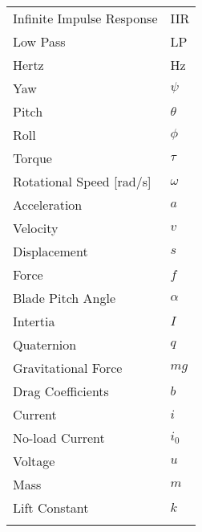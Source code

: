 \begin{center}
\begin{tabular}{l|l}
Infinite Impulse Response & IIR \\
Low Pass & LP \\\rowcolor{gainsboro}
Hertz & Hz \\
Yaw & $\psi$ \\\rowcolor{gainsboro}
Pitch & $\theta$  \\
Roll & $\phi$  \\\rowcolor{gainsboro}
Torque & $\tau$ \\
Rotational Speed [rad/s] & $\omega$ \\\rowcolor{gainsboro}
Acceleration & $a$ \\
Velocity & $v$ \\\rowcolor{gainsboro}
Displacement & $s$ \\
Force & $f$ \\\rowcolor{gainsboro}
Blade Pitch Angle & $\alpha$ \\
Intertia & $I$  \\\rowcolor{gainsboro}
Quaternion & $q$ \\
Gravitational Force & $mg$ \\\rowcolor{gainsboro}
Drag Coefficients & $b$  \\
Current & $i$ \\\rowcolor{gainsboro}
No-load Current & $i_0$ \\
Voltage & $u$ \\\rowcolor{gainsboro}
Mass & $m$ \\
Lift Constant & $k$\\\rowcolor{gainsboro}
\end{tabular}
\end{center}
\newpage


    
